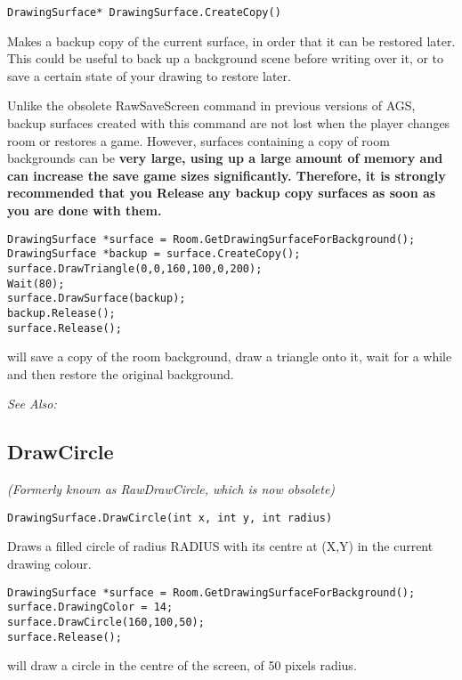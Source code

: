 \begin{verbatim}
DrawingSurface* DrawingSurface.CreateCopy()
\end{verbatim}
Makes a backup copy of the current surface, in order that it can be
restored later. This could be useful to back up a background scene before
writing over it, or to save a certain state of your drawing to restore
later.

Unlike the obsolete RawSaveScreen command in previous versions of AGS, backup
surfaces created with this command are not lost when the player changes room or
restores a game. However, surfaces containing a copy of room backgrounds can
be \bf{very large}, using up a large amount of memory and can increase the
save game sizes significantly. Therefore, it is \bf{strongly recommended} that
you Release any backup copy surfaces as soon as you are done with them.

\begin{verbatim}
DrawingSurface *surface = Room.GetDrawingSurfaceForBackground();
DrawingSurface *backup = surface.CreateCopy();
surface.DrawTriangle(0,0,160,100,0,200);
Wait(80);
surface.DrawSurface(backup);
backup.Release();
surface.Release();
\end{verbatim}
will save a copy of the room background, draw a triangle onto it, wait for
a while and then restore the original background.

\it{See Also:} 


\subsection{DrawCircle}\label{DrawingSurface.DrawCircle}%

\it{(Formerly known as RawDrawCircle, which is now obsolete)}

\begin{verbatim}
DrawingSurface.DrawCircle(int x, int y, int radius)
\end{verbatim}
Draws a filled circle of radius RADIUS with its centre at (X,Y) in the current drawing colour.

\begin{verbatim}
DrawingSurface *surface = Room.GetDrawingSurfaceForBackground();
surface.DrawingColor = 14;
surface.DrawCircle(160,100,50);
surface.Release();
\end{verbatim}
will draw a circle in the centre of the screen, of 50 pixels radius.

